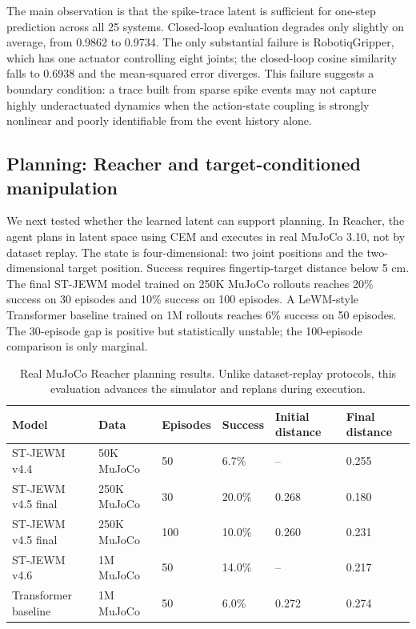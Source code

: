 \documentclass[10pt]{article}
\newcommand{\method}{ST-JEWM}
\begin{document}
The main observation is that the spike-trace latent is sufficient for one-step prediction across all 25 systems. Closed-loop evaluation degrades only slightly on average, from 0.9862 to 0.9734. The only substantial failure is RobotiqGripper, which has one actuator controlling eight joints; the closed-loop cosine similarity falls to 0.6938 and the mean-squared error diverges. This failure suggests a boundary condition: a trace built from sparse spike events may not capture highly underactuated dynamics when the action-state coupling is strongly nonlinear and poorly identifiable from the event history alone.

\subsection{Planning: Reacher and target-conditioned manipulation}

We next tested whether the learned latent can support planning. In Reacher, the agent plans in latent space using CEM and executes in real MuJoCo 3.10, not by dataset replay. The state is four-dimensional: two joint positions and the two-dimensional target position. Success requires fingertip-target distance below 5 cm. The final \method{} model trained on 250K MuJoCo rollouts reaches 20\% success on 30 episodes and 10\% success on 100 episodes. A LeWM-style Transformer baseline trained on 1M rollouts reaches 6\% success on 50 episodes. The 30-episode gap is positive but statistically unstable; the 100-episode comparison is only marginal.

\begin{table}[t]
\centering
\caption{Real MuJoCo Reacher planning results. Unlike dataset-replay protocols, this evaluation advances the simulator and replans during execution.}
\label{tab:reacher}
\small
\begin{tabular}{llllll}
\toprule
Model & Data & Episodes & Success & Initial distance & Final distance \\
\midrule
\method{} v4.4 & 50K MuJoCo & 50 & 6.7\% & -- & 0.255 \\
\method{} v4.5 final & 250K MuJoCo & 30 & 20.0\% & 0.268 & 0.180 \\
\method{} v4.5 final & 250K MuJoCo & 100 & 10.0\% & 0.260 & 0.231 \\
\method{} v4.6 & 1M MuJoCo & 50 & 14.0\% & -- & 0.217 \\
Transformer baseline & 1M MuJoCo & 50 & 6.0\% & 0.272 & 0.274 \\
\bottomrule
\end{tabular}
\end{table}
\end{document}

